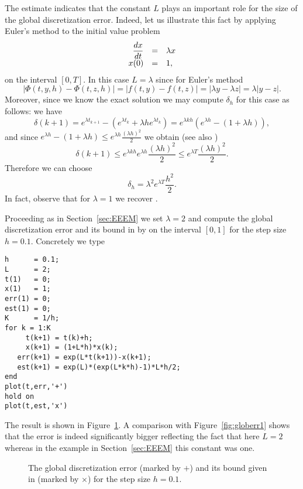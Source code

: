 \documentclass{ximera}
\begin{document}
The estimate  indicates that the constant $L$
plays an important role for the size of the global discretization error.
Indeed, let us illustrate this fact by applying Euler's method to the
initial value problem
\begin{equation} \label{exam:Lchange}
\begin{array}{rcl}
\displaystyle\frac{dx}{dt} & = & \lambda x\\
 x(0) & = & 1,
\end{array}
\end{equation}
on the interval $[0,T]$.
In this case $L=\lambda$ since for Euler's method
\[
|\Phi(t,y,h)-\Phi(t,z,h)|=|f(t,y)-f(t,z)|=|\lambda y-\lambda z|=\lambda |y-z|.
\]
Moreover, since we know the exact solution we may compute 
$\delta_h$ for this case as follows: we have
\[
\delta(k+1) = e^{\lambda t_{k+1}} - (e^{\lambda t_k} + 
\lambda h e^{\lambda t_k}) = e^{\lambda kh}(e^{\lambda h}-(1+\lambda h)),
\]
and since $e^{\lambda h}-(1+\lambda h)\le 
e^{\lambda h}\frac{(\lambda h)^2}{2}$ we obtain (see also )
\[
\delta(k+1)\le e^{\lambda kh} e^{\lambda h}\frac{(\lambda h)^2}{2}\le 
e^{\lambda T}\frac{(\lambda h)^2}{2}.
\]
Therefore we can choose 
\begin{equation} \label{eq:dhlam}
\delta_h = \lambda^2 e^{\lambda T} \frac{h^2}{2}.
\end{equation}
In fact, observe that for $\lambda=1$ we recover .

Proceeding as in Section~\ref{sec:EEEM} we set $\lambda =2$ and
compute the global
discretization error 
and its bound in  by
\Matlab on the interval $[0,1]$ for the step size $h=0.1$.  
Concretely we type
\begin{verbatim}
h      = 0.1;
L      = 2;
t(1)   = 0;
x(1)   = 1;
err(1) = 0;
est(1) = 0;
K      = 1/h;
for k = 1:K
     t(k+1) = t(k)+h;
     x(k+1) = (1+L*h)*x(k);
   err(k+1) = exp(L*t(k+1))-x(k+1);
   est(k+1) = exp(L)*(exp(L*k*h)-1)*L*h/2;
end
plot(t,err,'+')
hold on
plot(t,est,'x')
\end{verbatim}
The result is shown in Figure~\ref{fig:Lgeest}.  A comparison with
Figure~\ref{fig:globerr1} shows that the error is indeed significantly bigger
reflecting the fact that here $L=2$ whereas in the example in 
Section~\ref{sec:EEEM} this constant was one.

\begin{figure}[htb]
   \centerline{%
   }
   \caption{The global discretization error (marked by
   $+$) and its bound given in \protect{}
   (marked by $\times$) for the step size $h=0.1$.}
   \label{fig:Lgeest}
\end{figure}
\end{document}
